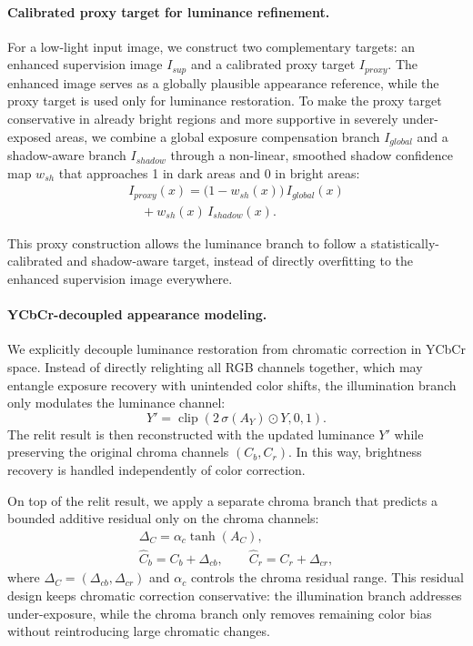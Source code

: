 \paragraph{Calibrated proxy target for luminance refinement.}
For a low-light input image, we construct two complementary targets:
an enhanced supervision image $I_{sup}$ and a calibrated proxy target
$I_{proxy}$. The enhanced image serves as a globally plausible appearance
reference, while the proxy target is used only for luminance restoration. To
make the proxy target conservative in already bright regions and more
supportive in severely under-exposed areas, we combine a global exposure
compensation branch $I_{global}$ and a shadow-aware branch $I_{shadow}$ through
a non-linear, smoothed shadow confidence map $w_{sh}$ that approaches 1 in dark areas and 0 in bright areas:
\begin{equation}
\begin{gathered}
I_{proxy}(x)
=
\big(1-w_{sh}(x)\big)\,I_{global}(x) \\
\quad + w_{sh}(x)\,I_{shadow}(x).
\end{gathered}
\end{equation}

This proxy construction allows the luminance branch to follow a
statistically-calibrated and shadow-aware target, instead of directly
overfitting to the enhanced supervision image everywhere.

\paragraph{YCbCr-decoupled appearance modeling.}
We explicitly decouple luminance restoration from chromatic correction in YCbCr
space. Instead of directly relighting all RGB channels together, which may
entangle exposure recovery with unintended color shifts, the illumination branch
only modulates the luminance channel:
\begin{equation}
Y' = \operatorname{clip}(2\,\sigma(A_Y)\odot Y,0,1).
\end{equation}
The relit result is then reconstructed with the updated luminance $Y'$ while
preserving the original chroma channels $(C_b,C_r)$. In this way, brightness
recovery is handled independently of color correction.

On top of the relit result, we apply a separate chroma branch that predicts a
bounded additive residual only on the chroma channels:
\begin{equation}
\begin{gathered}
\Delta_C = \alpha_c\tanh(A_C), \\
\hat C_b = C_b+\Delta_{cb}, \qquad \hat C_r = C_r+\Delta_{cr},
\end{gathered}
\end{equation}
where $\Delta_C=(\Delta_{cb},\Delta_{cr})$ and $\alpha_c$ controls the chroma
residual range. This residual design keeps chromatic correction conservative:
the illumination branch addresses under-exposure, while the chroma branch only
removes remaining color bias without reintroducing large chromatic changes.

